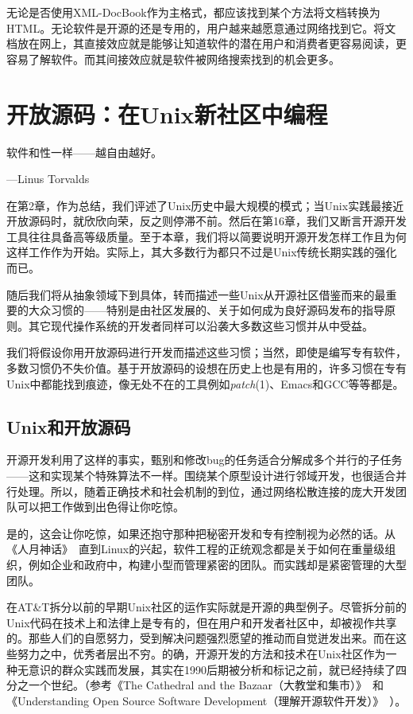 \documentclass[12pt,oneside]{ctexbook}
\begin{document}
\begin{common-format}
无论是否使用XML-DocBook作为主格式，都应该找到某个方法将文档转换为HTML。无论软件是开源的还是专用的，用户越来越愿意通过网络找到它。将文档放在网上，其直接效应就是能够让知道软件的潜在用户和消费者更容易阅读，更容易了解软件。而其间接效应就是软件被网络搜索找到的机会更多。



\chapter{开放源码：在Unix新社区中编程}
\begin{flushright}
\begin{notecard}{15em}
 软件和性一样——越自由越好。

{\hfill —Linus Torvalds}
\end{notecard}
\end{flushright}

在第2章，作为总结，我们评述了Unix历史中最大规模的模式；当Unix实践最接近开放源码时，就欣欣向荣，反之则停滞不前。然后在第16章，我们又断言开源开发工具往往具备高等级质量。至于本章，我们将以简要说明开源开发怎样工作且为何这样工作作为开始。实际上，其大多数行为都只不过是Unix传统长期实践的强化而已。

随后我们将从抽象领域下到具体，转而描述一些Unix从开源社区借鉴而来的最重要的大众习惯的——特别是由社区发展的、关于如何成为良好源码发布的指导原则。其它现代操作系统的开发者同样可以沿袭大多数这些习惯并从中受益。

我们将假设你用开放源码进行开发而描述这些习惯；当然，即使是编写专有软件，多数习惯仍不失价值。基于开放源码的设想在历史上也是有用的，许多习惯在专有Unix中都能找到痕迹，像无处不在的工具例如\textit{patch}(1)、Emacs和GCC等等都是。


\section{Unix和开放源码}
开源开发利用了这样的事实，甄别和修改bug的任务适合分解成多个并行的子任务——这和实现某个特殊算法不一样。围绕某个原型设计进行邻域开发，也很适合并行处理。所以，随着正确技术和社会机制的到位，通过网络松散连接的庞大开发团队可以把工作做到出色得让你吃惊。

是的，这会让你吃惊，如果还抱守那种把秘密开发和专有控制视为必然的话。从《人月神话》~\cite{Brooks}直到Linux的兴起，软件工程的正统观念都是关于如何在重量级组织，例如企业和政府中，构建小型而管理紧密的团队。而实践却是紧密管理的大型团队。

在AT\&{}T拆分以前的早期Unix社区的运作实际就是开源的典型例子。尽管拆分前的Unix代码在技术上和法律上是专有的，但在用户和开发者社区中，却被视作共享的。那些人们的自愿努力，受到解决问题强烈愿望的推动而自觉迸发出来。而在这些努力之中，优秀者层出不穷。的确，开源开发的方法和技术在Unix社区作为一种无意识的群众实践而发展，其实在1990后期被分析和标记之前，就已经持续了四分之一个世纪。（参考《The Cathedral and the Bazaar（大教堂和集市）》~\cite{Raymond01}和《Understanding Open Source Software Development（理解开源软件开发）》~\cite{Feller-Fitzgerald}）。


\end{common-format}
\end{document}
